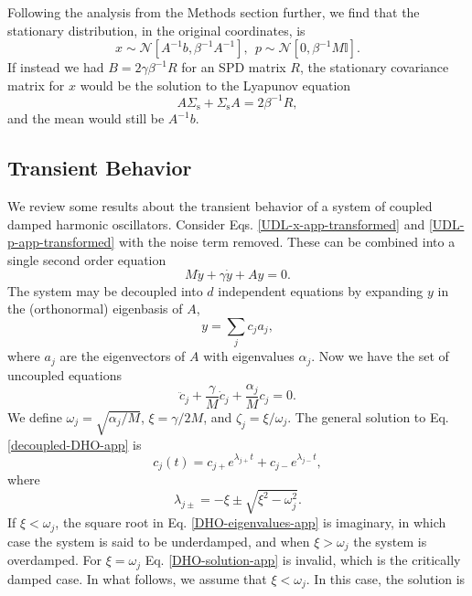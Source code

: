 \documentclass[prx,onecolumn,floatfix,longbibliography,notitlepage, nofootinbib]{revtex4-1}
\begin{document}
\begin{appendix}
\begin{equation}
\end{equation}
Following the analysis from the Methods section further, we find that the stationary distribution, in the original coordinates, is
\begin{equation}
    x \sim \mathcal{N}[A^{-1}b, \beta^{-1}A^{-1}], \: \: p \sim  \mathcal{N}\left[0, \beta^{-1}M \mathbb{I}\right].
\end{equation}
If instead we had $B = 2\gamma\beta^{-1}R$ for an SPD matrix $R$, the stationary covariance matrix for $x$ would be the solution to the Lyapunov equation
\begin{equation}
    A \Sigma_\text{s} +\Sigma_\text{s} A =2\beta^{-1}R,
\end{equation}
and the mean would still be $A^{-1}b$.

\subsection{Transient Behavior}
We review some results about the transient behavior of a system of coupled damped harmonic oscillators. Consider Eqs. \eqref{UDL-x-app-transformed} and \eqref{UDL-p-app-transformed} with the noise term removed. These can be combined into a single second order equation
\begin{equation}
 M   \ddot{y} + \gamma \dot{y} + A y =0.
\end{equation}
The system may be decoupled into $d$ independent equations by expanding $y$ in the (orthonormal) eigenbasis of $A$,
\begin{equation}
y = \sum_j c_j a_j,
\end{equation}
where $a_j$ are the eigenvectors of $A$ with eigenvalues $\alpha_j$. Now we have the set of uncoupled equations
\begin{equation}
\label{decoupled-DHO-app}
  \ddot{c}_j + \frac{\gamma}{M} \dot{c}_j+ \frac{\alpha_j}{M} c_j =0.
\end{equation}
We define $\omega_j = \sqrt{\alpha_j/M}$, $\xi = \gamma/2M$, and $\zeta_j = \xi/\omega_j $. The general solution to Eq. \eqref{decoupled-DHO-app} is
\begin{equation}
\label{DHO-solution-app}
    c_j(t) = c_{j+} e^{\lambda_{j+} t} + c_{j-}e^{\lambda_{j-}t},
\end{equation}
where 
\begin{equation}
\label{DHO-eigenvalues-app}
    \lambda_{j\pm}=  - \xi \pm \sqrt{\xi^2 - \omega_j^2}.
\end{equation}
If $\xi < \omega_j$, the square root in Eq. \eqref{DHO-eigenvalues-app} is imaginary, in which case the system is said to be underdamped, and when $\xi > \omega_j$ the system is overdamped. For $\xi = \omega_j$ Eq. \eqref{DHO-solution-app} is invalid, which is the critically damped case. In what follows, we assume that $\xi < \omega_j$. In this case, the solution is

\end{appendix}
\end{document}
